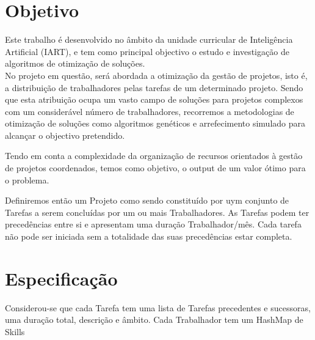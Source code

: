 \documentclass[a4paper]{article}
\begin{document}

\newpage

\section*{Objetivo}

Este trabalho é desenvolvido no âmbito da unidade curricular de Inteligência Artificial (IART), e tem como principal objectivo o estudo e investigação de algoritmos de otimização de soluções. \\ No projeto em questão, será abordada a otimização da gestão de projetos, isto é, a distribuição de trabalhadores pelas tarefas de um determinado projeto. Sendo que esta atribuição ocupa um vasto campo de soluções para projetos complexos com um considerável número de trabalhadores, recorremos a metodologias de otimização de soluções como algoritmos genéticos e arrefecimento simulado para alcançar o objectivo pretendido.

 \par Tendo em conta a complexidade da organização de recursos orientados à gestão de projetos coordenados, temos como objetivo, o output de um valor ótimo para o problema.  
 
 \par Definiremos então um Projeto como sendo constituído por uym conjunto de Tarefas a serem concluídas por um ou mais Trabalhadores. As Tarefas podem ter precedências entre si e apresentam uma duração Trabalhador/mês. Cada tarefa não pode ser iniciada sem a totalidade das suas precedências estar completa.
 


\newpage

\tableofcontents



\newpage

\section{Especificação}
Considerou-se que cada Tarefa tem uma lista de Tarefas precedentes e sucessoras, uma duração total, descrição e âmbito. Cada Trabalhador tem um HashMap de Skills
\end{document}
